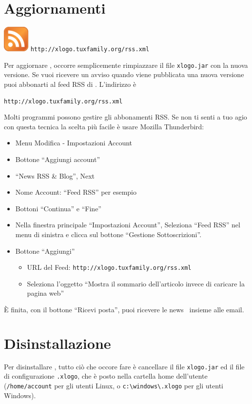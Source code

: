 \section{Aggiornamenti \xlogo}
\begin{center}
\includegraphics{pics/rss.png} \hspace{1cm} \texttt{http://xlogo.tuxfamily.org/rss.xml}
\end{center}
Per aggiornare \xlogo, occorre semplicemente rimpiazzare il file \texttt{xlogo.jar} con la nuova versione. 
Se vuoi ricevere un avviso quando viene pubblicata una nuova versione puoi abbonarti al feed RSS di \xlogo. L'indirizzo è 
\begin{center}
 \texttt{http://xlogo.tuxfamily.org/rss.xml}
\end{center}
Molti programmi possono gestire gli abbonamenti RSS. Se non ti senti a tuo agio con questa tecnica la scelta più facile è usare Mozilla Thunderbird:
\begin{itemize}
 \item Menu Modifica - Impostazioni Account
 \item Bottone ``Aggiungi account''
 \item ``News RSS \& Blog'', Next
 \item Nome Account: ``Feed RSS'' per esempio
 \item Bottoni ``Continua'' e ``Fine''
 \item Nella finestra principale ``Impostazioni Account'', Seleziona ``Feed RSS'' nel menu di sinistra e clicca sul bottone ``Gestione Sottoscrizioni''.
 \item Bottone ``Aggiungi''
	\begin{itemize}
 	\item URL del Feed: \texttt{http://xlogo.tuxfamily.org/rss.xml}
	\item Seleziona l'oggetto ``Mostra il sommario dell'articolo invece di caricare la pagina web''
	\end{itemize}
\end{itemize}
\vspace*{0.2cm}
È finita, con il bottone ``Ricevi posta'', puoi ricevere le news \xlogo\ insieme alle email.
\section{Disinstallazione}\label{fichier_perso}
Per disinstallare \xlogo, tutto ciò che occore fare è cancellare il file \texttt{xlogo.jar} ed il file di configurazione \texttt{.xlogo}\label{file_perso}, che è posto nella cartella home dell'utente (\texttt{/home/account} per gli utenti Linux, o \texttt{c:\textbackslash windows\textbackslash.xlogo} per gli utenti Windows).
